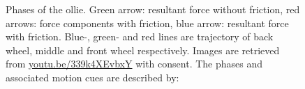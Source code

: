 \documentclass[default,iicol]{sn-jnl}
\begin{document}
\begin{figure}[!t]
  \protect\newline
  \centering
  \captionsetup{singlelinecheck=off}
   \caption[Ollie motion cues]{Phases of the ollie.
    Green arrow: resultant force without friction, red arrows: force components
    with friction, blue arrow: resultant force with friction. Blue-, green- and
    red lines are trajectory of back wheel, middle and front wheel respectively. Images are retrieved from \url{youtu.be/339k4XEvbxY} with consent. The phases and associated motion cues are described by:\\
}
\end{figure}
\end{document}
